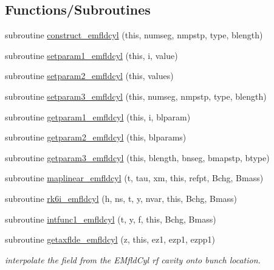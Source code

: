 \subsection*{Functions/\+Subroutines}
\begin{DoxyCompactItemize}
\item 
subroutine \mbox{\hyperlink{namespaceemfldcylclass_a70ad259f3db6c392c07a4fa46cb7461b}{construct\+\_\+emfldcyl}} (this, numseg, nmpstp, type, blength)
\item 
subroutine \mbox{\hyperlink{namespaceemfldcylclass_a8d9d8db5c093803ef59ad5bc4873e745}{setparam1\+\_\+emfldcyl}} (this, i, value)
\item 
subroutine \mbox{\hyperlink{namespaceemfldcylclass_a5ea9bb43c35afba9da054ba9d06a691c}{setparam2\+\_\+emfldcyl}} (this, values)
\item 
subroutine \mbox{\hyperlink{namespaceemfldcylclass_a9d9de556d5c18607ebed47a0615fdd44}{setparam3\+\_\+emfldcyl}} (this, numseg, nmpstp, type, blength)
\item 
subroutine \mbox{\hyperlink{namespaceemfldcylclass_af1fa0868ef29363ce860ff3d67cb49ed}{getparam1\+\_\+emfldcyl}} (this, i, blparam)
\item 
subroutine \mbox{\hyperlink{namespaceemfldcylclass_a691ed53cff8adba275fc7b782c9065b8}{getparam2\+\_\+emfldcyl}} (this, blparams)
\item 
subroutine \mbox{\hyperlink{namespaceemfldcylclass_adf4df0b6ae1ec53f13894e1bdfe962ae}{getparam3\+\_\+emfldcyl}} (this, blength, bnseg, bmapstp, btype)
\item 
subroutine \mbox{\hyperlink{namespaceemfldcylclass_a6ecff12cc9860de4f3ec126083db6fea}{maplinear\+\_\+emfldcyl}} (t, tau, xm, this, refpt, Bchg, Bmass)
\item 
subroutine \mbox{\hyperlink{namespaceemfldcylclass_a9bd0c565261b617a6860bb5ae288b486}{rk6i\+\_\+emfldcyl}} (h, ns, t, y, nvar, this, Bchg, Bmass)
\item 
subroutine \mbox{\hyperlink{namespaceemfldcylclass_ae4610622d1f42f54717c97aab5324391}{intfunc1\+\_\+emfldcyl}} (t, y, f, this, Bchg, Bmass)
\item 
subroutine \mbox{\hyperlink{namespaceemfldcylclass_ad20d4f71c528ba16303a936f78d0c44e}{getaxflde\+\_\+emfldcyl}} (z, this, ez1, ezp1, ezpp1)
\begin{DoxyCompactList}\small\item\em interpolate the field from the E\+Mfld\+Cyl rf cavity onto bunch location. \end{DoxyCompactList}\item 

\end{DoxyCompactItemize}
